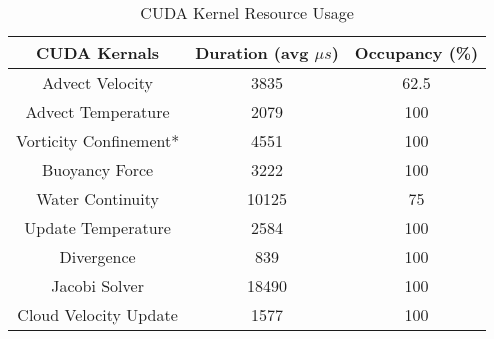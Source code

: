 \begin{table}[h]
\centering
\centering\caption{CUDA Kernel Resource Usage}
\label{tbl:ck}
    \begin{tabular}{c|cc}
    \bf{CUDA Kernals} & \bf{Duration} (avg $\mu s$) & \bf{Occupancy} (\%) \\ \hline\hline
    Advect Velocity        & 3835                         & 62.5           \\
    Advect Temperature     & 2079                         & 100            \\
    Vorticity Confinement* & 4551                         & 100            \\
    Buoyancy Force         & 3222                         & 100            \\
    Water Continuity       & 10125                        & 75             \\
    Update Temperature     & 2584                         & 100            \\
    Divergence             & 839                          & 100            \\
    Jacobi Solver          & 18490                        & 100            \\
    Cloud Velocity Update  & 1577                         & 100            \\
    \end{tabular}
\end{table}